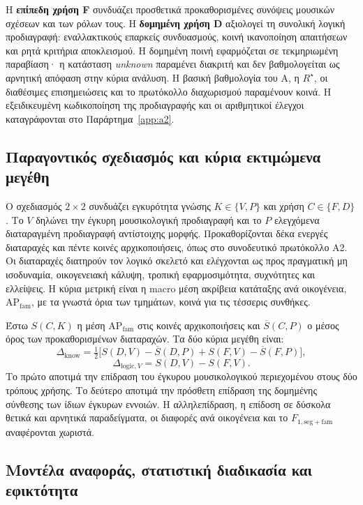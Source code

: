 \documentclass[11pt,a4paper]{article}
\begin{document}
Η \textbf{επίπεδη χρήση F} συνδυάζει προσθετικά προκαθορισμένες συνόψεις μουσικών σχέσεων και των ρόλων τους. Η \textbf{δομημένη χρήση D} αξιολογεί τη συνολική λογική προδιαγραφή: εναλλακτικούς επαρκείς συνδυασμούς, κοινή ικανοποίηση απαιτήσεων και ρητά κριτήρια αποκλεισμού. Η δομημένη ποινή εφαρμόζεται σε τεκμηριωμένη παραβίαση· η κατάσταση \emph{unknown} παραμένει διακριτή και δεν βαθμολογείται ως αρνητική απόφαση στην κύρια ανάλυση. Η βασική βαθμολογία του A, η $R^\star$, οι διαθέσιμες επισημειώσεις και το πρωτόκολλο διαχωρισμού παραμένουν κοινά. Η εξειδικευμένη κωδικοποίηση της προδιαγραφής και οι αριθμητικοί έλεγχοι καταγράφονται στο Παράρτημα~\ref{app:a2}.

\subsection{Παραγοντικός σχεδιασμός και κύρια εκτιμώμενα μεγέθη}

Ο σχεδιασμός $2\times2$ συνδυάζει εγκυρότητα γνώσης $K\in\{V,P\}$ και χρήση $C\in\{F,D\}$. Το $V$ δηλώνει την έγκυρη μουσικολογική προδιαγραφή και το $P$ ελεγχόμενα διαταραγμένη προδιαγραφή αντίστοιχης μορφής. Προκαθορίζονται δέκα ενεργές διαταραχές και πέντε κοινές αρχικοποιήσεις, όπως στο συνοδευτικό πρωτόκολλο Α2. Οι διαταραχές διατηρούν τον λογικό σκελετό και ελέγχονται ως προς πραγματική μη ισοδυναμία, οικογενειακή κάλυψη, τροπική εφαρμοσιμότητα, συχνότητες και ελλείψεις. Η κύρια μετρική είναι η macro μέση ακρίβεια κατάταξης ανά οικογένεια, $\mathrm{AP}_{\mathrm{fam}}$, με τα γνωστά όρια των τμημάτων, κοινά για τις τέσσερις συνθήκες.

Έστω $S(C,K)$ η μέση $\mathrm{AP}_{\mathrm{fam}}$ στις κοινές αρχικοποιήσεις και $\overline S(C,P)$ ο μέσος όρος των προκαθορισμένων διαταραχών. Τα δύο κύρια μεγέθη είναι:
\[
\Delta_{\mathrm{know}}=\tfrac12\bigl[S(D,V)-\overline S(D,P)+S(F,V)-\overline S(F,P)\bigr],
\]
\[
\Delta_{\mathrm{logic},V}=S(D,V)-S(F,V).
\]
Το πρώτο αποτιμά την επίδραση του έγκυρου μουσικολογικού περιεχομένου στους δύο τρόπους χρήσης. Το δεύτερο αποτιμά την πρόσθετη επίδραση της δομημένης σύνθεσης των ίδιων έγκυρων εννοιών. Η αλληλεπίδραση, η επίδοση σε δύσκολα θετικά και αρνητικά παραδείγματα, οι διαφορές ανά οικογένεια και το $F_{1,\mathrm{seg+fam}}$ αναφέρονται χωριστά.

\subsection{Μοντέλα αναφοράς, στατιστική διαδικασία και εφικτότητα}
\end{document}
